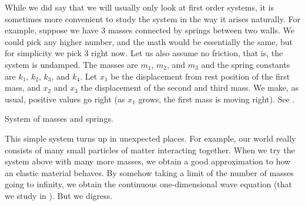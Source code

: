 While we did say that we will usually only look at first order systems, it is
sometimes more convenient to study the system in the way it arises naturally.
For example, suppose we have 3 masses connected by springs between two
walls.  We could pick any higher number, and the math would be essentially
the same, but for simplicity we pick 3 right now.  Let us also assume no
friction, that is, the system is undamped.
The masses are $m_1$, $m_2$, and
$m_3$ and the spring constants are $k_1$, $k_2$, $k_3$, and $k_4$.
Let $x_1$ be the displacement from rest position of the first mass, and
$x_2$ and $x_3$ the displacement of the second and third mass.  We make,
as usual, positive values go right (as $x_1$ grows, the first mass is
moving right).
See .

\begin{myfig}
\capstart
{}
\caption{System of masses and springs.\label{sosa:threecartsfig}}
\end{myfig}

This simple system turns up in unexpected places.  For example, 
our world really consists of many small particles of matter interacting together.
When we try the system above with many more masses, we obtain a good approximation to
how an elastic material behaves.  By somehow taking a limit of
the number of masses going to infinity, we obtain the continuous
one-dimensional wave equation (that we study in ).
But we digress.

